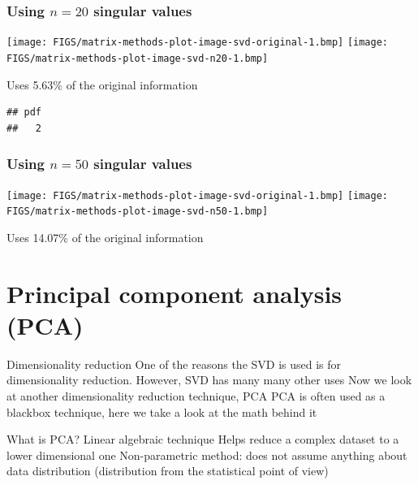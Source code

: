 \documentclass[aspectratio=169]{beamer}\usepackage[]{graphicx}\usepackage[]{xcolor}
\makeatletter
\newenvironment{kframe}{%
 \def\at@end@of@kframe{}%
 \ifinner\ifhmode%
  \def\at@end@of@kframe{\end{minipage}}%
  \begin{minipage}{\columnwidth}%
 \fi\fi%
 \def\FrameCommand##1{\hskip\@totalleftmargin \hskip-\fboxsep
 \colorbox{shadecolor}{##1}\hskip-\fboxsep
     \hskip-\linewidth \hskip-\@totalleftmargin \hskip\columnwidth}%
 \MakeFramed {\advance\hsize-\width
   \@totalleftmargin\z@ \linewidth\hsize
   \@setminipage}}%
 {\par\unskip\endMakeFramed%
 \at@end@of@kframe}
\newenvironment{knitrout}{}{} %
\makeatother
\begin{document}
\begin{frame}\frametitle{Using $n=20$ singular values}
\begin{center}
\texttt{[image: FIGS/matrix-methods-plot-image-svd-original-1.bmp]}
\texttt{[image: FIGS/matrix-methods-plot-image-svd-n20-1.bmp]}
\end{center}
\vfill
Uses 5.63\% of the original information
\end{frame}



\begin{knitrout}
\color{fgcolor}\begin{kframe}
\begin{verbatim}
## pdf 
##   2
\end{verbatim}
\end{kframe}
\end{knitrout}

\begin{frame}\frametitle{Using $n=50$ singular values}
\begin{center}
\texttt{[image: FIGS/matrix-methods-plot-image-svd-original-1.bmp]}
\texttt{[image: FIGS/matrix-methods-plot-image-svd-n50-1.bmp]}
\end{center}
\vfill
Uses 14.07\% of the original information
\end{frame}




\section{Principal component analysis (PCA)}


\begin{frame}{Dimensionality reduction}
One of the reasons the SVD is used is for dimensionality reduction. However, SVD has many many other uses
\vfill
Now we look at another dimensionality reduction technique, PCA
\vfill
PCA is often used as a blackbox technique, here we take a look at the math behind it
\end{frame}


\begin{frame}{What is PCA?}
Linear algebraic technique 
\vfill
Helps reduce a complex dataset to a lower dimensional one
\vfill
Non-parametric method: does not assume anything about data distribution (distribution from the statistical point of view)
\end{frame}
\end{document}
